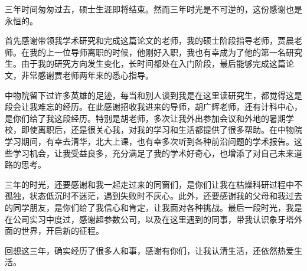 

三年时间匆匆过去，硕士生涯即将结束。然而三年时光是不可逆的，这份感谢也是永恒的。

首先感谢带领我学术研究和完成这篇论文的老师，我的硕士阶段指导老师，贾晨老师。在我的上一位导师离职的时候，他刚好入职，我也有幸成为了他的第一名研究生。由于我的研究方向发生变化，长时间都处在入门阶段，最后能够完成这篇论文，非常感谢贾老师两年来的悉心指导。

中物院留下过许多英雄的足迹，每当和别人谈到我是在这里读研究生，都觉得这是段会让我难忘的经历。在此感谢招收我进来的导师，胡广辉老师，还有计科中心，是你们给了我这段经历。特别是胡老师，多次让我外出参加会议和外地的暑期学校，即使离职后，还是很关心我，对我的学习和生活都提供了很多帮助。在中物院学习期间，有幸去清华，北大上课，也有幸多次听到各种前沿问题的学术报告。这些学习机会，让我受益良多，充分满足了我的学术好奇心，也增添了对自己未来道路的思考。

三年的时光，还要感谢和我一起走过来的同窗们，是你们让我在枯燥科研过程中不孤独，状态低沉时不迷茫，遇到失败时不灰心。此外，还要感谢我的父母和我过去的同学朋友，是你们给了我信心和肯定，让我面对各种挑战。最后一段时光，我是在公司实习中度过，感谢超参数公司，以及在这里遇到的同事，带我认识象牙塔外面的世界，开启新的征程。

回想这三年，确实经历了很多人和事，感谢有你们，让我认清生活，还依然热爱生活。
